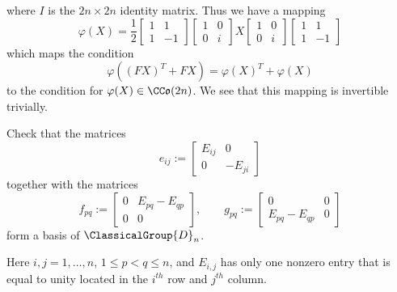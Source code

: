 where $I$ is the $2n\times2n$ identity matrix. Thus we have a
mapping
\begin{equation}
\varphi(X)=\frac{1}{2}\begin{bmatrix}1&1\\1&-1\end{bmatrix}\begin{bmatrix}1&0\\
0&i\end{bmatrix}X\begin{bmatrix}1&0\\
0&i\end{bmatrix}\begin{bmatrix}1&1\\1&-1\end{bmatrix}
\end{equation}
which maps the condition
\begin{equation}
\varphi\left((FX)^{T}+FX\right)=\varphi(X)^{T}+\varphi(X)
\end{equation}
to the condition for $\varphi(X)\in\CC\frak{o}(2n)$. We see
that this mapping is invertible trivially.

\begin{exercise}
Check that the matrices
\begin{equation}
e_{ij}:=\begin{bmatrix}E_{ij}&0\\
0&-E_{ji}
\end{bmatrix}
\end{equation}
together with the matrices
\begin{equation}
f_{pq}:=\begin{bmatrix}0&E_{pq}-E_{qp}\\
0&0
\end{bmatrix},\qquad
g_{pq}:=\begin{bmatrix}0&0\\
E_{pq}-E_{qp}&0
\end{bmatrix}
\end{equation}
form a basis of $\ClassicalGroup{D}_{n}$. 

Here $i,j=1,\ldots,n$, $1\leq p<q\leq n$, and $E_{i,j}$ has only
one nonzero entry that is equal to unity located in the $i^{th}$
row and $j^{th}$ column.
\end{exercise}

